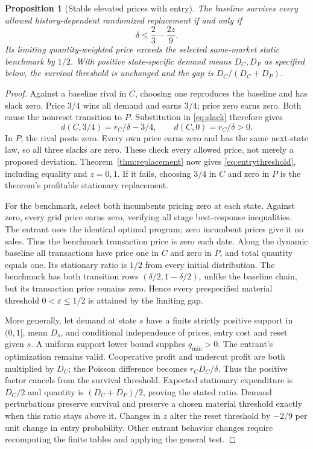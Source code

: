 \documentclass[11pt,a4paper]{article}
\newtheorem{proposition}[theorem]{Proposition}
\begin{document}
\begin{proposition}[Stable elevated prices with entry]\label{prop:entry}
The baseline survives every allowed history-dependent randomized replacement
if and only if
\begin{equation}\label{eq:entrythreshold}
 \delta\leq\frac23-\frac{2z}{9}.
\end{equation}
Its limiting quantity-weighted price exceeds the selected same-market static
benchmark by $1/2$. With positive state-specific demand means $D_C,D_P$ as
specified below, the survival threshold is unchanged and the gap is
$D_C/(D_C+D_P)$.
\end{proposition}
\begin{proof}
Against a baseline rival in $C$, choosing one reproduces the baseline and
has slack zero. Price $3/4$ wins all demand and earns $3/4$; price zero earns
zero. Both cause the nonreset transition to $P$. Substitution in
\eqref{eq:slack} therefore gives
\[
 d(C,3/4)=r_C/\delta-3/4,
 \qquad d(C,0)=r_C/\delta>0.
\]
In $P$, the rival posts zero. Every own price earns zero and has the same
next-state law, so all three slacks are zero. These check every allowed
price, not merely a proposed deviation. Theorem~\ref{thm:replacement} now
gives \eqref{eq:entrythreshold}, including equality and $z=0,1$.
If it fails, choosing $3/4$ in $C$ and zero in $P$ is the theorem's profitable
stationary replacement.

For the benchmark, select both incumbents pricing zero at each state. Against
zero, every grid price earns zero, verifying all stage best-response inequalities.
The entrant uses the identical optimal program; zero incumbent prices give
it no sales. Thus the benchmark transaction price is zero each date. Along
the dynamic baseline all transactions have price one in $C$ and zero in $P$,
and total quantity equals one. Its stationary ratio is $1/2$ from every
initial distribution. The benchmark has both transition rows
$(\delta/2,1-\delta/2)$, unlike the baseline chain, but its transaction price
remains zero. Hence every prespecified material
threshold $0<\varepsilon\leq1/2$ is attained by the limiting gap.

More generally, let demand at state $s$ have a finite strictly positive support
in $(0,1]$, mean $D_s$, and conditional independence of prices, entry cost and
reset given $s$. A uniform support lower bound supplies $q_{\min}>0$.
The entrant's optimization remains valid. Cooperative profit and undercut
profit are both multiplied by $D_C$; the Poisson difference becomes
$r_CD_C/\delta$. Thus the positive factor cancels from the survival threshold.
Expected stationary expenditure is $D_C/2$ and quantity is
$(D_C+D_P)/2$, proving the stated ratio. Demand perturbations preserve
survival and preserve a chosen material threshold exactly when this ratio
stays above it. Changes in $z$ alter the reset threshold by $-2/9$ per unit
change in entry probability. Other entrant behavior changes require recomputing
the finite tables and applying the general test.
\end{proof}
\end{document}
